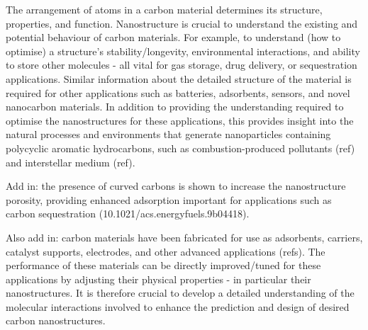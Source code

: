 The arrangement of atoms in a carbon material determines its structure, properties, and function. Nanostructure is crucial to understand the existing and potential behaviour of carbon materials. For example, to understand (how to optimise) a structure's stability/longevity, environmental interactions, and ability to store other molecules - all vital for gas storage, drug delivery, or sequestration applications.  Similar information about the detailed structure of the material is required for other applications such as batteries, adsorbents, %
sensors, and novel nanocarbon materials.
In addition to providing the understanding required to optimise the nanostructures for these applications, this provides insight into the natural processes and environments that generate nanoparticles containing polycyclic aromatic hydrocarbons, such as combustion-produced pollutants (ref) and interstellar medium (ref).

Add in: the presence of curved carbons is shown to increase the nanostructure porosity, providing enhanced adsorption important for applications such as carbon sequestration (10.1021/acs.energyfuels.9b04418).

Also add in: carbon materials have been fabricated for use as adsorbents, carriers, catalyst supports, electrodes, and other advanced applications (refs).  The performance of these materials can be directly improved/tuned for these applications by adjusting their physical properties - in particular their nanostructures.  It is therefore crucial to develop a detailed understanding of the molecular interactions involved to enhance the prediction and design of desired carbon nanostructures.




